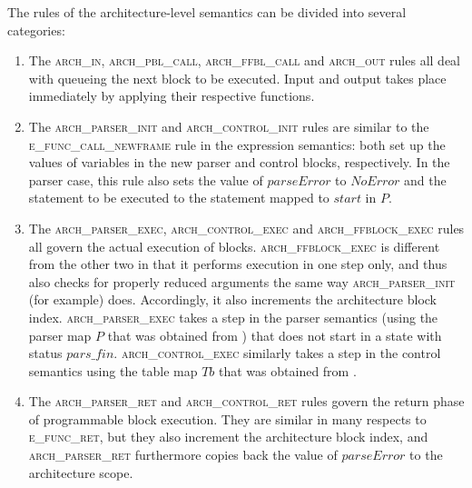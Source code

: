 \documentclass[UTF8]{article}
\begin{document}
The rules of the architecture-level semantics can be divided into several categories:
\begin{enumerate}
\item The \textsc{arch\_in}, \textsc{arch\_pbl\_call}, \textsc{arch\_ffbl\_call} and \textsc{arch\_out} rules all deal with queueing the next block to be executed. Input and output takes place immediately by applying their respective functions.
\item The \textsc{arch\_parser\_init} and \textsc{arch\_control\_init} rules are similar to the \textsc{e\_func\_call\_newframe} rule in the expression semantics: both set up the values of variables in the new parser and control blocks, respectively. In the parser case, this rule also sets the value of $\mathit{parseError}$ to $\mathit{NoError}$ and the statement to be executed to the statement mapped to $\mathit{start}$ in $P$.
\item The \textsc{arch\_parser\_exec}, \textsc{arch\_control\_exec} and \textsc{arch\_ffblock\_exec} rules all govern the actual execution of blocks. \textsc{arch\_ffblock\_exec} is different from the other two in that it performs execution in one step only, and thus also checks for properly reduced arguments the same way \textsc{arch\_parser\_init} (for example) does. Accordingly, it also increments the architecture block index. \textsc{arch\_parser\_exec} takes a step in the parser semantics (using the parser map $P$ that was obtained from \pbm{}) that does not start in a state with status $\mathit{pars\_fin}$. \textsc{arch\_control\_exec} similarly takes a step in the control semantics using the table map $Tb$ that was obtained from \pbm{}.
\item The \textsc{arch\_parser\_ret} and \textsc{arch\_control\_ret} rules govern the return phase of programmable block execution. They are similar in many respects to \textsc{e\_func\_ret}, but they also increment the architecture block index, and \textsc{arch\_parser\_ret} furthermore copies back the value of $\mathit{parseError}$ to the architecture scope.
\end{enumerate}
\end{document}
